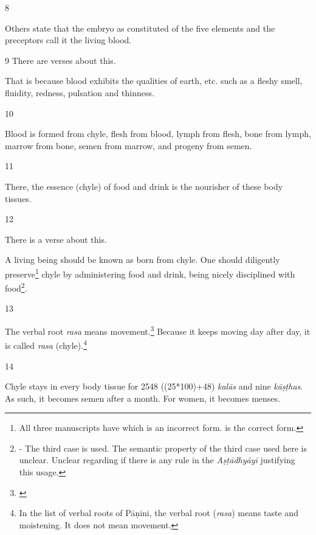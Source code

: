 \begin{translation}
\item [8]

Others state that the embryo as constituted of the five elements and the preceptors call it the living blood. 

\item [9]
There are verses about this.
\begin{sloka}
That is because blood exhibits the qualities of earth, etc. such as a fleshy smell, 
fluidity, redness, pulsation and thinness.
\end{sloka}

\item [10]

\begin{sloka}
Blood is formed from chyle, flesh from blood, lymph from flesh, bone from lymph, marrow from bone, semen from marrow, and progeny from semen. 
\end{sloka}

\item [11]

There, the essence (chyle) of food and drink is the nourisher of these body tissues.


\item[12]

There is a verse about this.

\begin{sloka}
A living being should be known as born from chyle. One should diligently preserve\footnote{All three manuscripts have  which is an incorrect form.  is the correct form.} chyle by administering food and drink, being nicely disciplined with food\footnote{ - The third case is used. The semantic property of the third case used here is unclear. Unclear regarding if there is any rule in the \emph{Aṣṭādhyāyī} justifying this usage.}.
\end{sloka}

\item[13]

The verbal root \emph{rasa} means movement.\footnote{\cite[109]{bhis-1907}} Because it keeps moving day after day, it is called \emph{rasa} (chyle).\footnote{In the list of verbal roots of Pāṇini, the verbal root (\emph{rasa}) means taste and moistening. It does not mean movement.}    

\item[14]

Chyle stays in every body tissue for 2548 ((25*100)+48) \emph{kalās} and nine \emph{kāṣṭhas}. As such, it becomes semen after a month. For women, it becomes menses.  


\end{translation}
